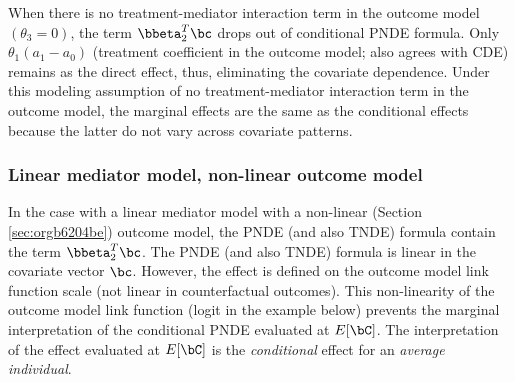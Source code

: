 \documentclass[10pt]{article}
\begin{document}
When there is no treatment-mediator interaction term in the outcome model \((\theta_{3} = 0)\), the term \(\bbeta_{2}^{T}\bc\) drops out of conditional PNDE formula. Only \(\theta_{1}(a_{1} - a_{0})\) (treatment coefficient in the outcome model; also agrees with CDE) remains as the direct effect, thus, eliminating the covariate dependence. Under this modeling assumption of no treatment-mediator interaction term in the outcome model, the marginal effects are the same as the conditional effects because the latter do not vary across covariate patterns.

\subsubsection{Linear mediator model, non-linear outcome model}
\label{sec:org4ab5998}
In the case with a linear mediator model with a non-linear (Section \ref{sec:orgb6204be}) outcome model, the PNDE (and also TNDE) formula contain the term \(\bbeta_{2}^{T}\bc\). The PNDE (and also TNDE) formula is linear in the covariate vector \(\bc\). However, the effect is defined on the outcome model link function scale (not linear in counterfactual outcomes). This non-linearity of the outcome model link function (logit in the example below) prevents the marginal interpretation of the conditional PNDE evaluated at \(E[\bC]\). The interpretation of the effect evaluated at \(E[\bC]\) is the \emph{conditional} effect for an \emph{average individual}.
\end{document}

